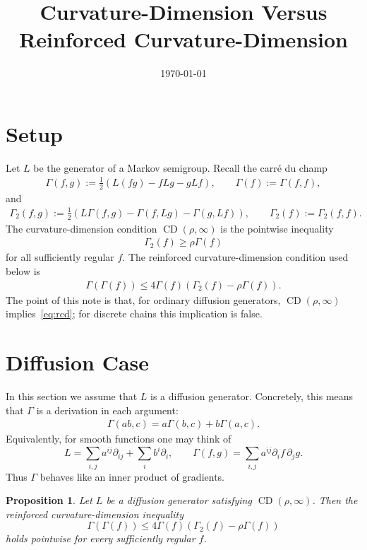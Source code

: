 \documentclass[11pt]{article}
\title{Curvature-Dimension Versus Reinforced Curvature-Dimension}
\date{\today}
\theoremstyle{plain}
\newtheorem{proposition}[theorem]{Proposition}
\theoremstyle{definition}
\theoremstyle{remark}
\begin{document}
\maketitle

\section{Setup}

Let $L$ be the generator of a Markov semigroup. Recall the carré du champ
\begin{align*}
    \Gamma(f,g) := \frac{1}{2}\left(L(fg)-fLg-gLf\right),
    \qquad
    \Gamma(f) := \Gamma(f,f),
\end{align*}
and
\begin{align*}
    \Gamma_2(f,g) := \frac{1}{2}\left(L\Gamma(f,g)-\Gamma(f,Lg)-\Gamma(g,Lf)\right),
    \qquad
    \Gamma_2(f):=\Gamma_2(f,f).
\end{align*}
The curvature-dimension condition $\operatorname{CD}(\rho,\infty)$ is the pointwise inequality
\begin{align*}
    \Gamma_2(f) \ge \rho \Gamma(f)
\end{align*}
for all sufficiently regular $f$. The reinforced curvature-dimension condition used below is
\begin{align}\label{eq:rcd}
    \Gamma(\Gamma(f)) \le 4\Gamma(f)\left(\Gamma_2(f)-\rho\Gamma(f)\right).
\end{align}
The point of this note is that, for ordinary diffusion generators, $\operatorname{CD}(\rho,\infty)$ implies~\eqref{eq:rcd}; for discrete chains this implication is false.

\section{Diffusion Case}

In this section we assume that $L$ is a diffusion generator. Concretely, this
means that $\Gamma$ is a derivation in each argument:
\begin{align}\label{eq:derivation}
    \Gamma(ab,c)=a\Gamma(b,c)+b\Gamma(a,c).
\end{align}
Equivalently, for smooth functions one may think of
\[
    L=\sum_{i,j}a^{ij}\partial_{ij}+\sum_i b^i\partial_i,
    \qquad
    \Gamma(f,g)=\sum_{i,j}a^{ij}\partial_i f\,\partial_j g.
\]
Thus $\Gamma$ behaves like an inner product of gradients.

\begin{proposition}
Let $L$ be a diffusion generator satisfying $\operatorname{CD}(\rho,\infty)$.
Then the reinforced curvature-dimension inequality
\[
    \Gamma(\Gamma(f))
    \le
    4\Gamma(f)\left(\Gamma_2(f)-\rho\Gamma(f)\right)
\]
holds pointwise for every sufficiently regular $f$.
\end{proposition}
\end{document}

